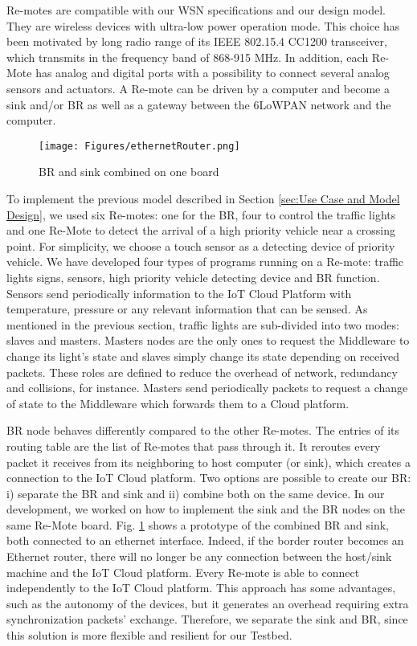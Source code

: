 Re-motes are compatible with our WSN specifications and our design model. They are wireless devices with ultra-low power operation mode. This choice has been motivated by long radio range of its IEEE 802.15.4 CC1200 transceiver, which transmits in the frequency band of 868-915 MHz. In addition, each Re-Mote has analog and digital ports with a possibility to connect several analog sensors and actuators. A Re-mote can be driven by a computer and become a sink and/or BR as well as a gateway between the 6LoWPAN network and the computer.

\begin{figure}[!htb]
\centering
\texttt{[image: Figures/ethernetRouter.png]}
\caption{BR and sink combined on one board}
\label{fig:ethernetRouter.png}
\end{figure}
To implement the previous model described in Section \ref{sec:Use Case and Model Design}, we used six Re-motes: one for the BR, four to control the traffic lights and one Re-Mote to detect the arrival of a high priority vehicle near a crossing point. For simplicity, we choose a touch sensor as a detecting device of priority vehicle. We have developed four types of programs running on a Re-mote: traffic lights signs, sensors, high priority vehicle detecting device and BR function. Sensors send periodically information to the IoT Cloud Platform with temperature, pressure or any relevant information that can be sensed. As mentioned in the previous section, traffic lights are sub-divided into two modes: slaves and masters. Masters nodes are the only ones to request the Middleware to change its light’s state and slaves simply change its state depending on received packets. These roles are defined to reduce the overhead of network, redundancy and collisions, for instance. Masters send periodically packets to request a change of state to the Middleware which forwards them to a Cloud platform.




 
BR node behaves differently compared to the other Re-motes. The entries of its routing table are the list of Re-motes that pass through it. It reroutes every packet it receives from its neighboring to host computer (or sink), which  creates a connection to the IoT Cloud platform. Two options are possible to create our BR: i) separate the BR and sink and ii) combine both on the same device. 
In our development, we worked on how to implement the sink and the BR nodes on the same Re-Mote board. Fig. \ref{fig:ethernetRouter.png} shows a prototype of the combined BR and sink, both connected to an ethernet interface. Indeed, if the border router becomes an Ethernet router, there will no longer be any connection between the host/sink machine and the IoT Cloud platform. Every Re-mote is able to connect independently to the IoT Cloud platform. This approach has some advantages, such as the autonomy of the devices, but it generates an overhead requiring extra synchronization packets' exchange. Therefore, we separate the sink and BR, since this solution is more flexible and resilient for our Testbed.

